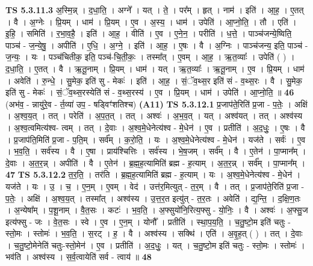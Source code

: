 \documentclass[17pt]{extarticle}
\begin{document}
                  \newline
                                \textbf{ TS 5.3.11.3} \newline
                  अ॒स्मि॒न्न् । द॒धा॒ति॒ । अग्ने᳚ । यत् । ते॒ । पर᳚म् । हृत् । नाम॑ । इति॑ । आ॒ह॒ । ए॒तत् । वै । अ॒ग्नेः । प्रि॒यम् । धाम॑ । प्रि॒यम् । ए॒व । अ॒स्य॒ । धाम॑ । उपेति॑ । आ॒प्नो॒ति॒ । तौ । एति॑ । इ॒हि॒ । समिति॑ । र॒भा॒व॒है॒ । इति॑ । आ॒ह॒ । वीति॑ । ए॒व । ए॒ने॒न॒ । परीति॑ । ध॒त्ते॒ । पाञ्च॑जन्ये॒ष्विति॒ पाञ्च॑ - ज॒न्ये॒षु॒ । अपीति॑ । ए॒धि॒ । अ॒ग्ने॒ । इति॑ । आ॒ह॒ । ए॒षः । वै । अ॒ग्निः । पाञ्च॑जन्य॒ इति॒ पाञ्च॑ - ज॒न्यः॒ । यः । पञ्च॑चितीक॒ इति॒ पञ्च॑-चि॒ती॒कः॒ । तस्मा᳚त् । ए॒वम् । आ॒ह॒ । ऋ॒त॒व्याः᳚ । उपेति॑ ( ) । द॒धा॒ति॒ । ए॒तत् । वै । ऋ॒तू॒नाम् । प्रि॒यम् । धाम॑ । यत् । ऋ॒त॒व्याः᳚ । ऋ॒तू॒नाम् । ए॒व । प्रि॒यम् । धाम॑ । अवेति॑ । रु॒न्धे॒ । सु॒मेक॒ इति॑ सु - मेकः॑ । इति॑ । आ॒ह॒ । सं॒ॅव॒थ्स॒र इति॑ सं - व॒थ्स॒रः । वै । सु॒मेक॒ इति॑ सु - मेकः॑ । सं॒ॅव॒थ्स॒रस्येति॑ सं - व॒थ्स॒रस्य॑ । ए॒व । प्रि॒यम् । धाम॑ । उपेति॑ । आ॒प्नो॒ति॒ ॥ \textbf{  46} \newline
                  \newline
                      (अभ॑व॒ - न्नायु॑रे॒॒व - र्त॒व्या॑ उप॒ - षड्विꣳ॑शतिश्च)  \textbf{(A11)} \newline \newline
                                \textbf{ TS 5.3.12.1} \newline
                  प्र॒जाप॑ते॒रिति॑ प्र॒जा - प॒तेः॒ । अक्षि॑ । अ॒श्व॒य॒त् । तत् । परेति॑ । अ॒प॒त॒त् । तत् । अश्वः॑ । अ॒भ॒व॒त् । यत् । अश्व॑यत् । तत् । अश्व॑स्य । अ॒श्व॒त्वमित्य॑श्व- त्वम् । तत् । दे॒वाः । अ॒श्व॒मे॒धेनेत्य॑श्व - मे॒धेन॑ । ए॒व । प्रतीति॑ । अ॒द॒धुः॒ । ए॒षः । वै । प्र॒जाप॑ति॒मिति॑ प्र॒जा - प॒ति॒म् । सर्व᳚म् । क॒रो॒ति॒ । यः । अ॒श्व॒मे॒धेनेत्य॑श्व - मे॒धेन॑ । यज॑ते । सर्वः॑ । ए॒व । भ॒व॒ति॒ । सर्व॑स्य । वै । ए॒षा । प्राय॑श्चित्तिः । सर्व॑स्य । भे॒ष॒जम् । सर्व᳚म् । वै । ए॒तेन॑ । पा॒प्मान᳚म् । दे॒वाः । अ॒त॒र॒न्न् । अपीति॑ । वै । ए॒तेन॑ । ब्र॒ह्म॒ह॒त्यामिति॑ ब्रह्म - ह॒त्याम् । अ॒त॒र॒न्न् । सर्व᳚म् । पा॒प्मान᳚म् । \textbf{  47} \newline
                  \newline
                                \textbf{ TS 5.3.12.2} \newline
                  त॒र॒ति॒ । तर॑ति । ब्र॒ह्म॒ह॒त्यामिति॑ ब्रह्म - ह॒त्याम् । यः । अ॒श्व॒मे॒धेनेत्य॑श्व - मे॒धेन॑ । यज॑ते । यः । उ॒ । च॒ । ए॒न॒म् । ए॒वम् । वेद॑ । उत्त॑र॒मित्युत् - त॒र॒म् । वै । तत् । प्र॒जाप॑ते॒रिति॑ प्र॒जा - प॒तेः॒ । अक्षि॑ । अ॒श्व॒य॒त् । तस्मा᳚त् । अश्व॑स्य । उ॒त्त॒र॒त इत्यु॑त् - त॒र॒तः । अवेति॑ । द्य॒न्ति॒ । द॒क्षि॒ण॒तः । अ॒न्येषा᳚म् । प॒शू॒नाम् । वै॒त॒सः । कटः॑ । भ॒व॒ति॒ । अ॒फ्सुयो॑नि॒रित्य॒फ्सु - यो॒निः॒ । वै । अश्वः॑ । अ॒फ्सु॒ज इत्य॑फ्सु - जः । वे॒त॒सः । स्वे । ए॒व । ए॒न॒म् । योनौ᳚ । प्रतीति॑ । स्था॒प॒य॒ति॒ । च॒तु॒ष्टो॒म इति॑ चतुः - स्तो॒मः । स्तोमः॑ । भ॒व॒ति॒ । स॒रट् । ह॒ । वै । अश्व॑स्य । सक्थि॑ । एति॑ । अ॒वृ॒ह॒त् ( ) । तत् । दे॒वाः । च॒तु॒ष्टो॒मेनेति॑ चतुः-स्तो॒मेन॑ । ए॒व । प्रतीति॑ । अ॒द॒धुः॒ । यत् । च॒तु॒ष्टो॒म इति॑ चतुः - स्तो॒मः । स्तोमः॑ । भव॑ति । अश्व॑स्य । स॒र्व॒त्वायेति॑ सर्व - त्वाय॑ ॥ \textbf{  48 } \newline
\end{document}
